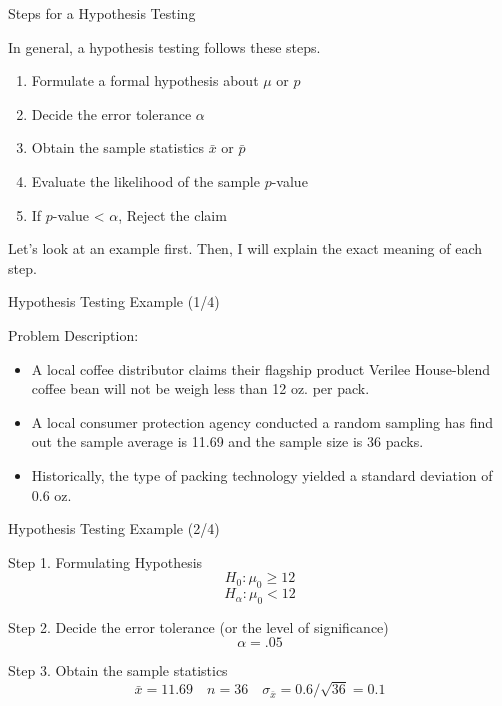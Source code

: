 \documentclass{beamer}
\begin{document}
\begin{frame}{Steps for a Hypothesis Testing}

In general, a hypothesis testing follows these steps. 

\begin{enumerate}
\item Formulate a formal hypothesis about $\mu$ or $p$
\item Decide the error tolerance $\alpha$
\item Obtain the sample statistics $\bar{x}$ or $\bar{p}$
\item Evaluate the likelihood of the sample $p$-value
\item If $p$-value < $\alpha$, Reject the claim
\end{enumerate}
\vspace{0.3 cm}
Let's look at an example first. Then, I will explain the exact meaning of each step. 

\end{frame}


\begin{frame}{Hypothesis Testing Example (1/4)}

Problem Description: 
\begin{itemize}
\item A local coffee distributor claims their flagship product Verilee House-blend coffee bean will not be weigh less than 12 oz. per pack. 
\item A local consumer protection agency conducted a random sampling has find out the sample average is 11.69 and the sample size is 36 packs. 
\item Historically, the type of packing technology yielded a standard deviation of 0.6 oz.  
\end{itemize}

\end{frame}

\begin{frame}{Hypothesis Testing Example (2/4)}

Step 1. Formulating Hypothesis 
$$ H_0:  \mu_0 \geq 12 $$
$$ H_\alpha: \mu_0 < 12 $$

Step 2. Decide the error tolerance (or the level of significance)
$$ \alpha = .05 $$ 

Step 3. Obtain the sample statistics 
$$ \bar{x} = 11.69 \quad n = 36 \quad \sigma_{\bar{x}} = 0.6/\sqrt{36} = 0.1 $$

\end{frame}
\end{document}
